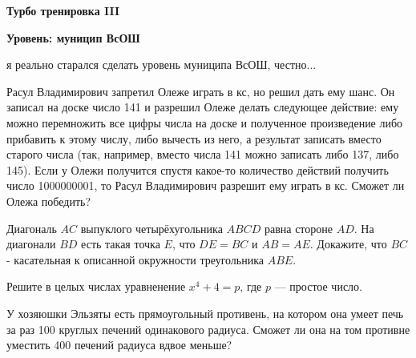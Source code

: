 \centerline{\bf \Huge Турбо тренировка III}
\centerline{\bf \Huge Уровень: муницип ВсОШ}

\begin{flushright}
        \scriptsize{я реально старался сделать уровень муниципа ВсОШ, честно...}
\end{flushright}

Расул Владимирович запретил Олеже играть в кс, но решил дать ему шанс. Он записал на доске число 141 и разрешил Олеже делать следующее действие: ему можно перемножить все цифры числа на доске и полученное произведение либо прибавить к этому числу, либо вычесть из него, а результат записать вместо старого числа (так, например, вместо числа 141 можно записать либо 137, либо 145). Если у Олежи получится спустя какое-то количество действий получить число 1000000001, то Расул Владимирович разрешит ему играть в кс. Сможет ли Олежа победить?

Диагональ $A C$ выпуклого четырёхугольника $A B C D$ равна стороне $A D$. На диагонали $B D$ есть такая точка $E$, что $D E=B C$ и $A B=A E$. Докажите, что $B C$ - касательная к описанной окружности треугольника $ABE$. 

Решите в целых числах уравненение $x^4 + 4 = p$, где $p$ --- простое число.

У хозяюшки Эльзяты есть прямоугольный противень, на котором она умеет печь за раз 100 круглых печений одинакового радиуса. Сможет ли она на том противне уместить 400 печений радиуса вдвое меньше?